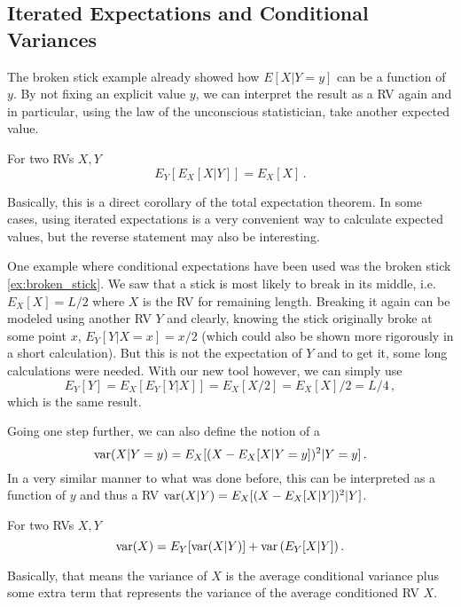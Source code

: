 	\subsection{Iterated Expectations and Conditional Variances}
The broken stick example already showed how $E[X | Y = y]$ can be a function of $y$. By not fixing an explicit value $y$, we can interpret the result as a RV again and in particular, using the law of the unconscious statistician, take another expected value.
\begin{prop}
For two RVs $X, Y$
\begin{equation}
E_Y[E_X[X | Y]] = E_X[X] \,. 
\end{equation}
\end{prop}
Basically, this is a direct corollary of the total expectation theorem. In some cases, using iterated expectations is a very convenient way to calculate expected values, but the reverse statement may also be interesting.


\begin{ex}
One example where conditional expectations have been used was the broken stick \ref{ex:broken_stick}. We saw that a stick is most likely to break in its middle, i.e.~$E_X[X] = L / 2$ where $X$ is the RV for remaining length. Breaking it again can be modeled using another RV $Y$ and clearly, knowing the stick originally broke at some point $x$, $E_Y[Y | X = x] = x / 2$ (which could also be shown more rigorously in a short calculation). But this is not the expectation of $Y$ and to get it, some long calculations were needed. With our new tool however, we can simply use
\begin{equation*}
E_Y[Y] = E_X[E_Y[Y | X]] = E_X[X / 2] = E_X[X] / 2 = L / 4 \, ,
\end{equation*}
which is the same result.
\end{ex}


Going one step further, we can also define the notion of a 
\begin{equation}
\operatorname{var}(X | Y = y) = E_X[(X - E_X[X | Y = y])^2 | Y = y] \, .
\end{equation}
In a very similar manner to what was done before, this can be interpreted as a function of $y$ and thus a RV $\operatorname{var}(X | Y) = E_X[(X - E_X[X | Y])^2 | Y]$.
\begin{prop}
For two RVs $X, Y$
\begin{equation}
\operatorname{var}(X) = E_Y\qty[\operatorname{var}(X | Y)] + \operatorname{var}\qty(E_Y[X | Y]) \, .
\end{equation}
\end{prop}
Basically, that means the variance of $X$ is the average conditional variance plus some extra term that represents the variance of the average conditioned RV $X$.



